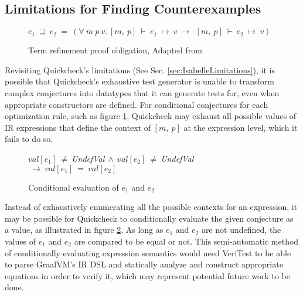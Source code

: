 \subsection{Limitations for Finding Counterexamples}

\begin{figure}[!htb]
    \centering
    \(e_1~\sqsupseteq~e_2~=~(\forall~m~p~v.~[m,~p]~\vdash~e_1~\mapsto~v~\longrightarrow~~[m,~p]~\vdash~e_2~\mapsto~v)\)

    \caption{Term refinement proof obligation, Adapted from \cite[Definition 6]{Term_Graph_Optimizations}}
    \label{fig:RefinementProofObligation}
\end{figure}

Revisiting Quickcheck's limitations (See Sec. \ref{sec:IsabelleLimitations}), it is possible that Quickcheck's exhaustive test generator 
is unable to transform complex conjectures into datatypes that it can generate tests for, even when appropriate constructors are defined. 
For conditional conjectures for each optimization rule, such as figure \ref{fig:RefinementProofObligation}, Quickcheck may exhaust all 
possible values of IR expressions that define the context of \([m,~p]\) at the expression level, which it fails to do so.

\begin{figure}[!htb]
    \centering
    \(val[e_1]~\neq~\)\emph{UndefVal}\(~\land~val[e_2]~\neq~\)\emph{UndefVal}\(~\longrightarrow~val[e_1]~=~val[e_2]\)

    \caption{Conditional evaluation of \(e_1\) and \(e_2\)}
    \label{fig:ConditionalEvaluation}
\end{figure}

Instead of exhaustively enumerating all the possible contexts for an expression, it may be possible for Quickcheck to conditionally evaluate 
the given conjecture as a value, as illustrated in figure \ref{fig:ConditionalEvaluation}. As long as \(e_1\) and \(e_2\) are not undefined, 
the values of \(e_1\) and \(e_2\) are compared to be equal or not. This semi-automatic method of conditionally evaluating expression semantics 
would need VeriTest to be able to parse GraalVM's IR DSL and statically analyze and construct appropriate equations in order to verify it, 
which may represent potential future work to be done.


